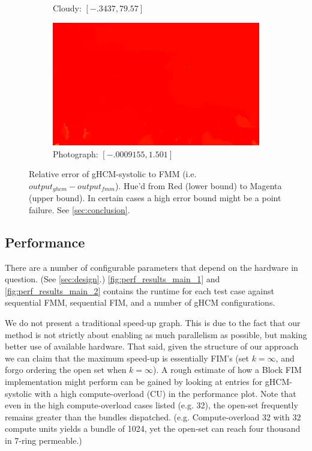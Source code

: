 \documentclass[11pt]{article}       %
\begin{document}
\begin{figure}
\begin{subfigure}[b]{.4\columnwidth}
		\caption{Cloudy: $[-.3437, 79.57]$}
	\end{subfigure}
	\begin{subfigure}[b]{.4\columnwidth}
		\includegraphics[width=\textwidth]{Figures/diff_photograph}
		\caption{Photograph: $[-.0009155, 1.501]$}
	\end{subfigure}
	\caption{Relative error of gHCM-systolic to FMM (i.e. $output_{ghcm} - output_{fmm}$). Hue'd from Red (lower bound) to Magenta (upper bound). In certain cases a high error bound might be a point failure. See \autoref{sec:conclusion}.}
	\label{fig:rel_error_output}
\end{figure}



\subsection{Performance}

There are a number of configurable parameters that depend on the hardware in question. (See \autoref{sec:design}.) \autoref{fig:perf_results_main_1} and \autoref{fig:perf_results_main_2} contains the runtime for each test case against sequential FMM, sequential FIM, and a number of gHCM configurations.

We do not present a traditional speed-up graph. This is due to the fact that our method is not strictly about enabling as much parallelism as possible, but making better use of available hardware. That said, given the structure of our approach we can claim that the maximum speed-up is essentially FIM's (set $k=\infty$, and forgo ordering the open set when $k = \infty$). A rough estimate of how a Block FIM implementation might perform can be gained by looking at entries for gHCM-systolic with a high compute-overload (CU) in the performance plot. Note that even in the high compute-overload cases listed (e.g. 32), the open-set frequently remains greater than the bundles dispatched. (e.g. Compute-overload 32 with 32 compute units yields a bundle of 1024, yet the open-set can reach four thousand in 7-ring permeable.)
\end{document}
